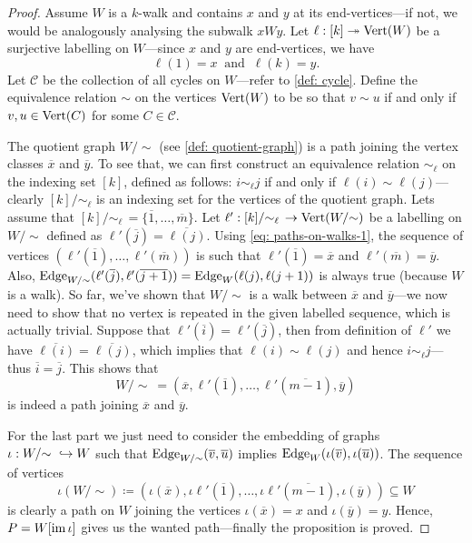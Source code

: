 \begin{proof}
    Assume \(W\) is a \(k\)-walk and contains \(x\) and \(y\) at its
    end-vertices---if not, we would be analogously analysing the subwalk
    \(xWy\). Let \(\ell: [k] \twoheadrightarrow \operatorname{Vert}(W)\) be a surjective labelling on
    \(W\)---since \(x\) and \(y\) are end-vertices, we have
    \begin{equation}\label{eq: paths-on-walks-1}
        \ell(1) = x\ \text{ and }\ \ell(k) = y.
    \end{equation}
    Let \(\mathcal C\) be the
    collection of all cycles on \(W\)---refer to \cref{def: cycle}. Define the
    equivalence relation \(\sim\) on the vertices \(\operatorname{Vert}(W)\) to be so that \(v \sim
    u\) if and only if \(v, u \in \operatorname{Vert}(C)\) for some \(C \in \mathcal C\).

    The quotient graph \(W/{\sim}\) (see \cref{def: quotient-graph}) is a path
    joining the vertex classes \(\overline x\) and \(\overline y\). To see that, we
    can first construct an equivalence relation \(\sim_\ell\) on the indexing set
    \([k]\), defined as follows: \(i \sim_\ell j\) if and only if
    \(\ell(i) \sim \ell(j)\)---clearly \([k]/{\sim_\ell}\) is an indexing set for
    the vertices of the quotient graph. Lets assume that
    \([k]/{\sim_\ell}\, = \{\overline 1, \dots, \overline m\}\). Let
    \(\ell': [k]/{\sim_\ell}\, \to \operatorname{Vert}(W/{\sim})\) be a labelling on
    \(W/{\sim}\) defined as \(\ell'(\overline j) = \overline{\ell(j)}\). Using
    \cref{eq: paths-on-walks-1}, the sequence of vertices
    \((\ell'(\overline 1), \dots, \ell'(\overline m))\) is such that
    \(\ell'(\overline 1) = \overline x\) and \(\ell'(\overline m) = \overline y\).
    Also,
    \(\operatorname{Edge}_{W/{\sim}}(\ell'(\overline j), \ell'(\overline{j + 1})) = \operatorname{Edge}_W(\ell(j),
    \ell(j+1))\) is always true (because \(W\) is a walk). So far, we've shown that
    \(W/{\sim}\) is a walk between \(\overline x\) and \(\overline y\)---we now
    need to show that no vertex is repeated in the given labelled sequence, which is
    actually trivial. Suppose that \(\ell'(\overline i) = \ell'(\overline j)\), then
    from definition of \(\ell'\) we have
    \(\overline{\ell(i)} = \overline{\ell(j)}\), which implies that
    \(\ell(i) \sim \ell(j)\) and hence \(i \sim_\ell j\)---thus
    \(\overline i = \overline j\). This shows that
    \[
        W/{\sim}\ = (\overline x, \ell'(\overline 1), \dots, \ell'(\overline{m - 1}),
        \overline y)
    \]
    is indeed a path joining \(\overline x\) and \(\overline y\).

    For the last part we just need to consider the embedding of graphs \(\iota: W/{\sim}\
    \hookrightarrow W\) such that \(\operatorname{Edge}_{W/{\sim}}(\overline v, \overline u)\) implies
    \(\operatorname{Edge}_W(\iota(\overline v), \iota(\overline u))\). The sequence of vertices
    \[
        \iota(W/{\sim}) \coloneqq (\iota(\overline x), \iota\ell'(\overline 1), \dots,
        \iota \ell'(\overline{m-1}), \iota(\overline y)) \subseteq W
    \]
    is clearly a path on \(W\) joining the vertices \(\iota(\overline x) = x\) and
    \(\iota(\overline y) = y\). Hence, \(P = W[\operatorname{im} \iota]\) gives us the wanted
    path---finally the proposition is proved.
\end{proof}

